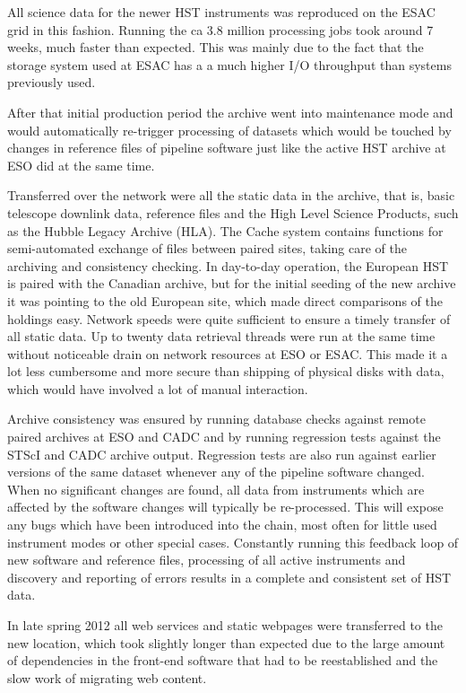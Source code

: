 All science data for the newer HST instruments was reproduced on the ESAC grid in this fashion. 
Running the ca 3.8 million processing jobs took around 7 weeks, much faster than expected. This was mainly due to the fact that the storage system used at ESAC has a a much higher I/O throughput than systems previously used.

After that initial production period the archive went into maintenance mode and would automatically re-trigger processing of datasets which would be touched by changes in reference files of pipeline software just like the active HST archive at ESO did at the same time.

Transferred over the network were all the static data in the archive, that
is, basic telescope downlink data, reference
files and the High Level Science Products, such as the Hubble Legacy
Archive (HLA).
The  Cache system contains functions for semi-automated exchange of files between paired sites, taking care of the archiving and consistency checking. In day-to-day operation, the European HST is paired with the Canadian archive, but for the initial seeding of the new archive  it was pointing to the old European site, which made direct comparisons of the holdings easy. 
Network speeds were quite sufficient to ensure a timely transfer of all static data. Up to twenty data retrieval threads were run at the same time without noticeable drain on network resources at ESO or ESAC. This made it a lot less cumbersome and more secure than shipping of physical disks with data, which would have involved a lot of manual interaction.

Archive consistency was  ensured by running 
database checks against remote paired archives at ESO and CADC 
and by running regression tests against the STScI and CADC archive output.
Regression tests are also run against earlier versions of the same dataset whenever any of the pipeline software changed. When no significant changes are found, all data from instruments which are affected by the software changes will typically be re-processed. This will expose any bugs which have been introduced into the chain, most often for little used instrument modes or other special cases.
Constantly  running this feedback loop of new software and reference files, processing of all active instruments and discovery and reporting of errors 
results in a complete and consistent set of HST data. 

In late spring 2012 all web services and static webpages were transferred to the new location, which took slightly longer than expected due to the large amount of dependencies in the front-end software that had to be reestablished and the slow work of migrating web content.

